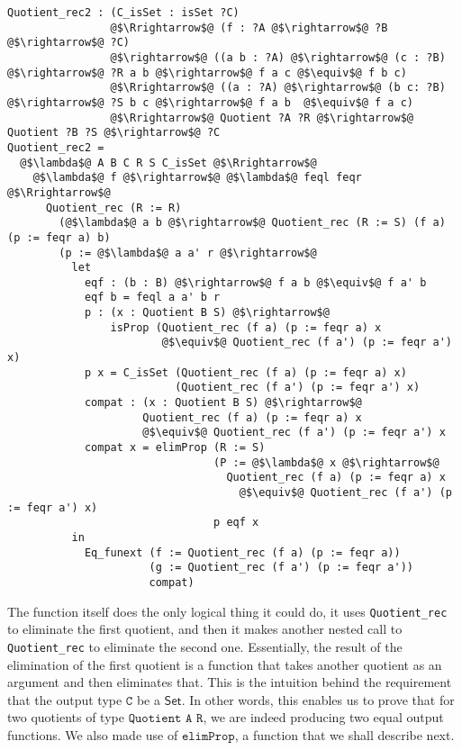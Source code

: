 \documentclass[12pt,twoside,maitrise]{dms}
\theoremstyle{definition}
\numberwithin{equation}{section}
\numberwithin{table}{chapter}
\numberwithin{figure}{chapter}
\newcommand\kw[1] {\textsf{#1}}
\newcommand\id[1] {\texttt{#1}}
\begin{document}
\begin{verbatim}
Quotient_rec2 : (C_isSet : isSet ?C)
                @$\Rrightarrow$@ (f : ?A @$\rightarrow$@ ?B @$\rightarrow$@ ?C)
                @$\rightarrow$@ ((a b : ?A) @$\rightarrow$@ (c : ?B) @$\rightarrow$@ ?R a b @$\rightarrow$@ f a c @$\equiv$@ f b c)
                @$\Rrightarrow$@ ((a : ?A) @$\rightarrow$@ (b c: ?B) @$\rightarrow$@ ?S b c @$\rightarrow$@ f a b  @$\equiv$@ f a c)
                @$\Rrightarrow$@ Quotient ?A ?R @$\rightarrow$@ Quotient ?B ?S @$\rightarrow$@ ?C
Quotient_rec2 =
  @$\lambda$@ A B C R S C_isSet @$\Rrightarrow$@
    @$\lambda$@ f @$\rightarrow$@ @$\lambda$@ feql feqr @$\Rrightarrow$@
      Quotient_rec (R := R)
        (@$\lambda$@ a b @$\rightarrow$@ Quotient_rec (R := S) (f a) (p := feqr a) b)
        (p := @$\lambda$@ a a' r @$\rightarrow$@
          let
            eqf : (b : B) @$\rightarrow$@ f a b @$\equiv$@ f a' b
            eqf b = feql a a' b r
            p : (x : Quotient B S) @$\rightarrow$@
                isProp (Quotient_rec (f a) (p := feqr a) x
                        @$\equiv$@ Quotient_rec (f a') (p := feqr a') x)
            p x = C_isSet (Quotient_rec (f a) (p := feqr a) x)
                          (Quotient_rec (f a') (p := feqr a') x)
            compat : (x : Quotient B S) @$\rightarrow$@
                     Quotient_rec (f a) (p := feqr a) x
                     @$\equiv$@ Quotient_rec (f a') (p := feqr a') x
            compat x = elimProp (R := S)
                                (P := @$\lambda$@ x @$\rightarrow$@
                                  Quotient_rec (f a) (p := feqr a) x
                                    @$\equiv$@ Quotient_rec (f a') (p := feqr a') x)
                                p eqf x
          in
            Eq_funext (f := Quotient_rec (f a) (p := feqr a))
                      (g := Quotient_rec (f a') (p := feqr a'))
                      compat)
\end{verbatim}

The function itself does the only logical thing it could do, it uses
\id{Quotient\_rec} to eliminate the first quotient, and then it makes another
nested call to \id{Quotient\_rec} to eliminate the second one. Essentially, the
result of the elimination of the first quotient is a function that takes another
quotient as an argument and then eliminates that. This is the intuition behind
the requirement that the output type $\id{C}$ be a $\kw{Set}$. In other words,
this enables us to prove that for two quotients of type $\id{Quotient A R}$, we
are indeed producing two equal output functions. We also made use of
$\id{elimProp}$, a function that we shall describe next.
\end{document}

